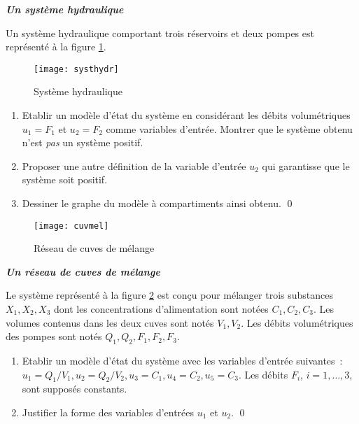 \begin{exercice}{\bf \em Un système hydraulique}

Un système hydraulique comportant trois réservoirs et deux pompes
est représenté à la figure \ref{Fig:systhydr}.
\begin{figure}[h]
\begin{center}
\texttt{[image: systhydr]}
\caption{Système hydraulique}
\label{Fig:systhydr}
\end{center} 
\end{figure}
\begin{enumerate}
\item Etablir un modèle d'état du système en considérant les
débits volumétriques $u_1 = F_1$ et $u_2 = F_2$ comme variables
d'entrée. Montrer que le système obtenu n'est {\it pas} un système
positif. 
\item Proposer une autre définition de la variable d'entrée $u_2$ qui
garantisse que le système soit positif. 
\item Dessiner le graphe du modèle à compartiments ainsi obtenu. \qed
\end{enumerate}
\end{exercice}
\vv 

\begin{figure}[!ht] 
\begin{center}
\texttt{[image: cuvmel]}
\caption{Réseau de cuves de mélange}
\label{Fig:cuvmel}
\end{center} 
\end{figure}

\begin{exercice}{\bf \em Un réseau de cuves de mélange}

Le système représenté à la figure \ref{Fig:cuvmel} est con\c cu pour
mélanger trois substances $X_1, X_2, X_3$ dont les concentrations
d'alimentation sont notées $C_1, C_2, C_3$. Les volumes contenus
dans les deux cuves sont notés $V_1, V_2$. Les débits volumétriques
des pompes sont notés $Q_1, Q_2, F_1, F_2, F_3$.

\begin{enumerate}
\item Etablir un modèle d'état du système avec les variables
d'entrée suivantes~: $u_1 = Q_1/V_1, u_2 = Q_2/V_2, u_3 = C_1, u_4 =
C_2, u_5 = C_3$. Les débits $F_i$, $i = 1, \dots , 3$, sont supposés
constants.
\item Justifier la forme des variables d'entrées $u_1$ et $u_2$. \qed
\end{enumerate}
\end{exercice}
\vv

